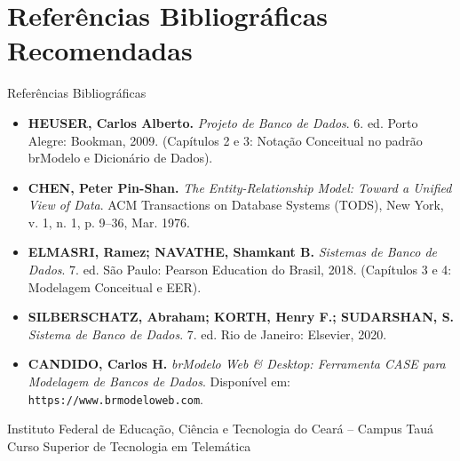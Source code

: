 \section[Referências]{Referências Bibliográficas Recomendadas}

\begin{frame}{Referências Bibliográficas}
  \begin{itemize}
    \scriptsize
    \item \textbf{HEUSER, Carlos Alberto.} \textit{Projeto de Banco de Dados}. 6. ed. Porto Alegre: Bookman, 2009. (Capítulos 2 e 3: Notação Conceitual no padrão brModelo e Dicionário de Dados).
    \item \textbf{CHEN, Peter Pin-Shan.} \textit{The Entity-Relationship Model: Toward a Unified View of Data}. ACM Transactions on Database Systems (TODS), New York, v. 1, n. 1, p. 9--36, Mar. 1976.
    \item \textbf{ELMASRI, Ramez; NAVATHE, Shamkant B.} \textit{Sistemas de Banco de Dados}. 7. ed. São Paulo: Pearson Education do Brasil, 2018. (Capítulos 3 e 4: Modelagem Conceitual e EER).
    \item \textbf{SILBERSCHATZ, Abraham; KORTH, Henry F.; SUDARSHAN, S.} \textit{Sistema de Banco de Dados}. 7. ed. Rio de Janeiro: Elsevier, 2020.
    \item \textbf{CANDIDO, Carlos H.} \textit{brModelo Web \& Desktop: Ferramenta CASE para Modelagem de Bancos de Dados}. Disponível em: \texttt{https://www.brmodeloweb.com}.
  \end{itemize}
  \vspace{0.15cm}
  \begin{center}
    \tiny\color{gray}
    Instituto Federal de Educação, Ciência e Tecnologia do Ceará -- Campus Tauá\\
    Curso Superior de Tecnologia em Telemática
  \end{center}
\end{frame}
